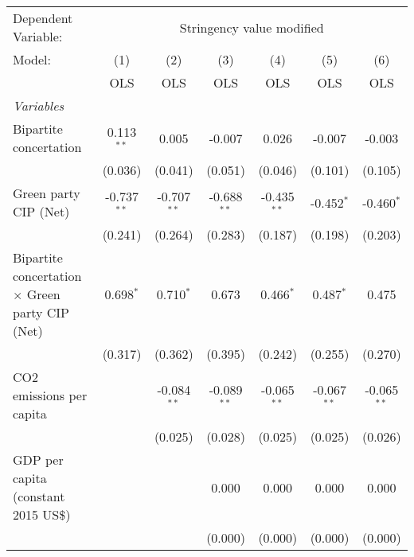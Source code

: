 
\begingroup
\centering
\begin{tabular}{lcccccc}
   \toprule
   Dependent Variable: & \multicolumn{6}{c}{Stringency value modified}\\
   Model:                                                 & (1)           & (2)           & (3)           & (4)           & (5)           & (6)\\  
                                                          &  OLS          & OLS           & OLS           & OLS           & OLS           & OLS\\  
   \midrule
   \emph{Variables}\\
   Bipartite concertation                                 & 0.113$^{**}$  & 0.005         & -0.007        & 0.026         & -0.007        & -0.003\\   
                                                          & (0.036)       & (0.041)       & (0.051)       & (0.046)       & (0.101)       & (0.105)\\   
   Green party CIP (Net)                                  & -0.737$^{**}$ & -0.707$^{**}$ & -0.688$^{**}$ & -0.435$^{**}$ & -0.452$^{*}$  & -0.460$^{*}$\\   
                                                          & (0.241)       & (0.264)       & (0.283)       & (0.187)       & (0.198)       & (0.203)\\   
   Bipartite concertation $\times$ Green party CIP (Net)  & 0.698$^{*}$   & 0.710$^{*}$   & 0.673         & 0.466$^{*}$   & 0.487$^{*}$   & 0.475\\   
                                                          & (0.317)       & (0.362)       & (0.395)       & (0.242)       & (0.255)       & (0.270)\\   
   CO2 emissions per capita                               &               & -0.084$^{**}$ & -0.089$^{**}$ & -0.065$^{**}$ & -0.067$^{**}$ & -0.065$^{**}$\\   
                                                          &               & (0.025)       & (0.028)       & (0.025)       & (0.025)       & (0.026)\\   
   GDP per capita (constant 2015 US\$)                    &               &               & 0.000         & 0.000         & 0.000         & 0.000\\   
                                                          &               &               & (0.000)       & (0.000)       & (0.000)       & (0.000)\\   

\end{tabular}
